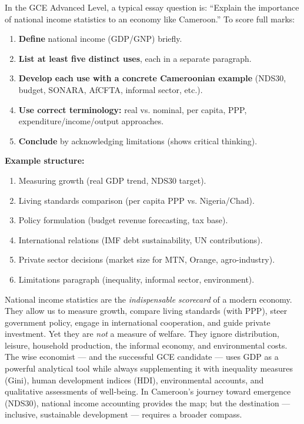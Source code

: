 \documentclass[11pt]{article}
\newcounter{popsec}
\newcounter{popsub}
\newcommand{\courssub}[1]{%
  \stepcounter{popsub}%
  \par\vspace{9pt}\noindent{\popxbold\fontsize{11.5}{13}\selectfont\color{popink}{\color{poporange}\thepopsec.\thepopsub}\hspace{6pt}#1}\par\nopagebreak\vspace{4pt}
}
\begin{document}
\begin{methode}
In the GCE Advanced Level, a typical essay question is: ``Explain the importance of national income statistics to an economy like Cameroon.'' To score full marks:
\begin{enumerate}
\item \textbf{Define} national income (GDP/GNP) briefly.
\item \textbf{List at least five distinct uses}, each in a separate paragraph.
\item \textbf{Develop each use with a concrete Cameroonian example} (NDS30, budget, SONARA, AfCFTA, informal sector, etc.).
\item \textbf{Use correct terminology:} real vs. nominal, per capita, PPP, expenditure/income/output approaches.
\item \textbf{Conclude} by acknowledging limitations (shows critical thinking).
\end{enumerate}
\textbf{Example structure:}
\begin{enumerate}
\item Measuring growth (real GDP trend, NDS30 target).
\item Living standards comparison (per capita PPP vs. Nigeria/Chad).
\item Policy formulation (budget revenue forecasting, tax base).
\item International relations (IMF debt sustainability, UN contributions).
\item Private sector decisions (market size for MTN, Orange, agro-industry).
\item Limitations paragraph (inequality, informal sector, environment).
\end{enumerate}
\end{methode}

\courssub{Summary}

National income statistics are the \emph{indispensable scorecard} of a modern economy. They allow us to measure growth, compare living standards (with PPP), steer government policy, engage in international cooperation, and guide private investment. Yet they are \emph{not} a measure of welfare. They ignore distribution, leisure, household production, the informal economy, and environmental costs. The wise economist --- and the successful GCE candidate --- uses GDP as a powerful analytical tool while always supplementing it with inequality measures (Gini), human development indices (HDI), environmental accounts, and qualitative assessments of well-being. In Cameroon's journey toward emergence (NDS30), national income accounting provides the map; but the destination --- inclusive, sustainable development --- requires a broader compass.
\end{document}
